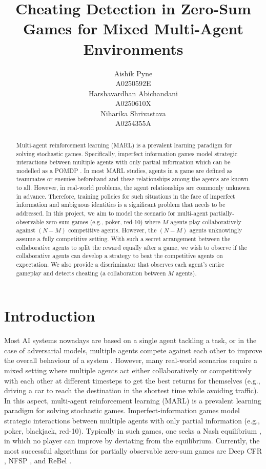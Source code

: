 \documentclass{article}
\title{Cheating Detection in Zero-Sum Games for Mixed Multi-Agent Environments}
\author{%
  Aishik Pyne \\
  A0250592E\\
  \And
   Harshavardhan Abichandani \\
  A0250610X\\
  \And
   Niharika Shrivastava\\
  A0254355A\\
}
\begin{document}
\maketitle

\begin{abstract} %

Multi-agent reinforcement learning (MARL) is a prevalent learning paradigm for solving stochastic games. Specifically, imperfect information games model strategic interactions between multiple agents with only partial information which can be modelled as a POMDP \cite{pomdp:blog}. In most MARL studies, agents in a game are defined as teammates or enemies beforehand and these relationships among the agents are known to all. However, in real-world problems, the agent relationships are commonly unknown in advance. Therefore, training policies for such situations in the face of imperfect information and ambiguous identities is a significant problem that needs to be addressed. In this project, we aim to model the scenario for multi-agent partially-observable zero-sum games (e.g., poker, red-10) where $M$ agents play collaboratively against $(N-M)$ competitive agents. However, the $(N-M)$ agents unknowingly assume a fully competitive setting. With such a secret arrangement between the collaborative agents to split the reward equally after a game, we wish to observe if the collaborative agents can develop a strategy to beat the competitive agents on expectation. We also provide a discriminator that observes each agent's entire gameplay and detects cheating (a collaboration between $M$ agents).

\end{abstract}

\section{Introduction} %

Most AI systems nowadays are based on a single agent tackling a task, or in the case of adversarial models, multiple agents compete against each other to improve the overall behaviour of a system \cite{marl:blog}. However, many real-world scenarios require a mixed setting where multiple agents act either collaboratively or competitively with each other at different timesteps to get the best returns for themselves (e.g., driving a car to reach the destination in the shortest time while avoiding traffic). In this aspect, multi-agent reinforcement learning (MARL) is a prevalent learning paradigm for solving stochastic games. Imperfect-information games model strategic interactions between multiple agents with only partial information (e.g., poker, blackjack, red-10). Typically in such games, one seeks a Nash equilibrium \cite{NashEq}, in which no player can improve by deviating from the equilibrium. Currently, the most successful algorithms for partially observable zero-sum games are Deep CFR \cite{dcfr:2018}, NFSP \cite{nsfp:2016}, and ReBel \cite{rebel:2020}. 
\end{document}
